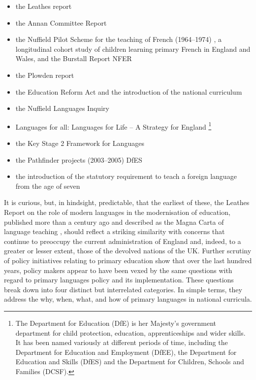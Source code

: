 \documentclass[output=paper]{langscibook}
\begin{document}
\begin{itemize}\sloppy
\item the Leathes report \citep{Leathes1918}
\item the Annan Committee Report \citep{Annan1962}
\item the Nuffield Pilot Scheme for the teaching of French (1964--1974) \citep{Burstall1975}, a longitudinal cohort study of children learning primary French in England and Wales, and the Burstall Report NFER \citep{BurstallEtAl1974}
\item the Plowden report \citep{Plowden1967}
\item the Education Reform Act \citep{DfES1988} and the introduction of the national curriculum
\item the Nuffield Languages Inquiry \citep{NuffieldFoundation2000}
\item Languages for all: Languages for Life -- A Strategy for England \citep{DfES2002}\footnote{The Department for Education (DfE) is her Majesty’s government department for child protection, education, apprenticeships and wider skills. It has been named variously at different periods of time, including the Department for Education and Employment (DfEE), the Department for Education and Skills (DfES) and the Department for Children, Schools and Families (DCSF).}
\item the Key Stage 2 Framework for Languages \citep{DCSF2005}
\item the Pathfinder projects (2003--2005) DfES \citep{MuijsEtAl2005}
\item the introduction of the statutory requirement to teach a foreign language from the age of seven \citep{DfE2014}
\end{itemize}

It is curious, but, in hindsight, predictable, that the earliest of these, the Leathes Report \citep{Leathes1918} on the role of modern languages in the modernisation of education, published more than a century ago and described as the Magna Carta of language teaching \citep{Byram2021}, should reflect a striking similarity with concerns that continue to preoccupy the current administration of England and, indeed, to a greater or lesser extent, those of the devolved nations of the UK. Further scrutiny of policy initiatives relating to primary education show that over the last hundred years, policy makers appear to have been vexed by the same questions with regard to primary languages policy and its implementation. These questions break down into four distinct but interrelated categories. In simple terms, they address the why, when, what, and how of primary languages in national curricula. 
\end{document}
